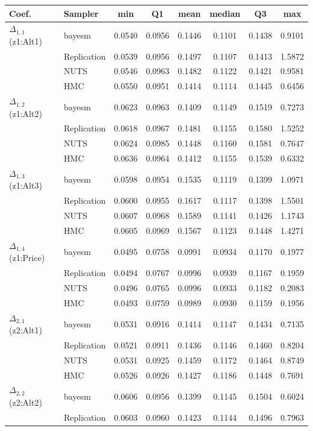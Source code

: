 \begin{tabular}{llcccccc}
\toprule
Coef. & Sampler & min & Q1 & mean & median & Q3 & max \\
\midrule
$\Delta_{1,1}$ (z1:Alt1) & bayesm & 0.0540 & 0.0956 & 0.1446 & 0.1101 & 0.1438 & 0.9101 \\
 & Replication & 0.0539 & 0.0956 & 0.1497 & 0.1107 & 0.1413 & 1.5872 \\
 & NUTS & 0.0546 & 0.0963 & 0.1482 & 0.1122 & 0.1421 & 0.9581 \\
 & HMC & 0.0550 & 0.0951 & 0.1414 & 0.1114 & 0.1445 & 0.6456 \\
$\Delta_{1,2}$ (z1:Alt2) & bayesm & 0.0623 & 0.0963 & 0.1409 & 0.1149 & 0.1519 & 0.7273 \\
 & Replication & 0.0618 & 0.0967 & 0.1481 & 0.1155 & 0.1580 & 1.5252 \\
 & NUTS & 0.0624 & 0.0985 & 0.1448 & 0.1160 & 0.1581 & 0.7647 \\
 & HMC & 0.0636 & 0.0964 & 0.1412 & 0.1155 & 0.1539 & 0.6332 \\
$\Delta_{1,3}$ (z1:Alt3) & bayesm & 0.0598 & 0.0954 & 0.1535 & 0.1119 & 0.1399 & 1.0971 \\
 & Replication & 0.0600 & 0.0955 & 0.1617 & 0.1117 & 0.1398 & 1.5501 \\
 & NUTS & 0.0607 & 0.0968 & 0.1589 & 0.1141 & 0.1426 & 1.1743 \\
 & HMC & 0.0605 & 0.0969 & 0.1567 & 0.1123 & 0.1448 & 1.4271 \\
$\Delta_{1,4}$ (z1:Price) & bayesm & 0.0495 & 0.0758 & 0.0991 & 0.0934 & 0.1170 & 0.1977 \\
 & Replication & 0.0494 & 0.0767 & 0.0996 & 0.0939 & 0.1167 & 0.1959 \\
 & NUTS & 0.0496 & 0.0765 & 0.0996 & 0.0933 & 0.1182 & 0.2083 \\
 & HMC & 0.0493 & 0.0759 & 0.0989 & 0.0930 & 0.1159 & 0.1956 \\
$\Delta_{2,1}$ (z2:Alt1) & bayesm & 0.0531 & 0.0916 & 0.1414 & 0.1147 & 0.1434 & 0.7135 \\
 & Replication & 0.0521 & 0.0911 & 0.1436 & 0.1146 & 0.1460 & 0.8204 \\
 & NUTS & 0.0531 & 0.0925 & 0.1459 & 0.1172 & 0.1464 & 0.8749 \\
 & HMC & 0.0526 & 0.0926 & 0.1427 & 0.1186 & 0.1448 & 0.7691 \\
$\Delta_{2,2}$ (z2:Alt2) & bayesm & 0.0606 & 0.0956 & 0.1399 & 0.1145 & 0.1504 & 0.6024 \\
 & Replication & 0.0603 & 0.0960 & 0.1423 & 0.1144 & 0.1496 & 0.7963 \\

\end{tabular}
